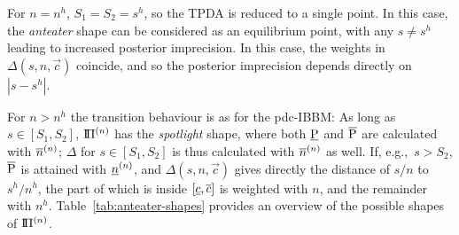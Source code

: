 
For $n = n^h$, $S_1 = S_2 = s^h$, so the TPDA is reduced to a single point. In this case, the \emph{anteater}
shape can be considered as an equilibrium point,
with any $s \neq s^h$ leading to increased posterior imprecision.
In this case, the weights in $\Delta(s, n, \vec{c})$ coincide, and so
the posterior imprecision depends directly on $|s-s^h|$.

For $n > n^h$ the transition behaviour is as for the pdc-IBBM:
As long as $s \in [S_1, S_2]$, $\text{I}\!\Pi^{(n)}$ has the \emph{spotlight} shape,
where both $\underline{\operatorname{P}}$ and $\overline{\operatorname{P}}$ are calculated with $\overline{n}^{(n)}$; $\Delta$ for $s \in [S_1, S_2]$ is
thus calculated with $\overline{n}^{(n)}$ as well.
If, e.g.,\ $s > S_2$, $\overline{\operatorname{P}}$ is attained with $\underline{n}^{(n)}$, and $\Delta(s, n, \vec{c})$
gives directly the distance of $s/n$ to $s^h/n^h$, the part of which is
inside $[\underline{c}, \overline{c}]$ is weighted with $n$, and the remainder with $n^h$.
Table~\ref{tab:anteater-shapes} provides an overview of the possible shapes of $\text{I}\!\Pi^{(n)}$.

